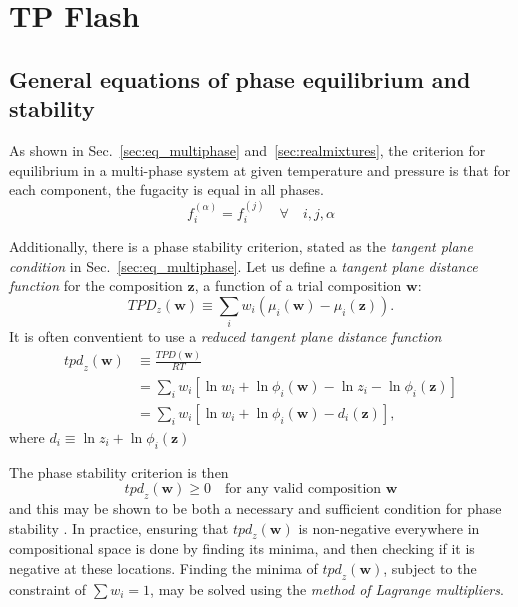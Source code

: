 \documentclass[english]{../thermomemo/thermomemo}
\newcommand*{\vektor}[1]{\boldsymbol{#1}}%
\begin{document}
\section{TP Flash}

\subsection{General equations of phase equilibrium and stability}
As shown in Sec.~\ref{sec:eq_multiphase} and~\ref{sec:realmixtures}, the criterion for equilibrium in a multi-phase system at given temperature 
and pressure is that for each component, the fugacity is equal in all phases.
\begin{equation}
  f_i^{(\alpha)} = f_i^{(j)} \quad \forall \quad i,j,\alpha
  \label{}
\end{equation}

Additionally, there is a phase stability criterion, stated as the \textit{tangent plane condition} in Sec.~\ref{sec:eq_multiphase}.
Let us define a \textit{tangent plane distance function} for the composition $\vektor{z}$, a function of a trial composition $\vektor{w}$:
\begin{equation}
  \mathit{TPD}_z(\vektor{w}) \equiv \sum_{i} w_i \left( \mu_i(\vektor{w}) - \mu_i(\vektor{z}) \right).
  \label{}
\end{equation}
It is often conventient to use a 
\textit{reduced tangent plane distance function}
\begin{align}
  \mathit{tpd}_z(\vektor{w}) &\equiv \frac{\mathit{TPD}(\vektor{w})}{RT} 
  \nonumber\\
  &= \sum_{i} w_i \left[ \ln w_i + \ln \phi_i(\vektor{w}) - \ln z_i - \ln \phi_i(\vektor{z}) \right]
  \nonumber\\
  &= \sum_{i} w_i \left[ \ln w_i + \ln \phi_i(\vektor{w}) - d_i(\vektor{z}) \right],
  \label{}
\end{align}
where $d_i \equiv \ln z_i + \ln \phi_i(\vektor{z}) $

The phase stability criterion is then
\begin{equation}
  \mathit{tpd}_z(\vektor{w}) \geq 0 \quad \text{for any valid composition $\vektor{w}$}
  \label{}
\end{equation}
and this may be shown to be both a necessary and sufficient condition for phase stability \cite{michelsen07}. 
In practice, ensuring that $\mathit{tpd}_z(\vektor{w})$ is non-negative everywhere in compositional space is done by finding its 
minima, and then checking if it is negative at these locations. Finding the minima of $\mathit{tpd}_z(\vektor{w})$, subject to the constraint of 
$\sum w_i = 1$, may be solved using the \textit{method of Lagrange multipliers}.
\end{document}
